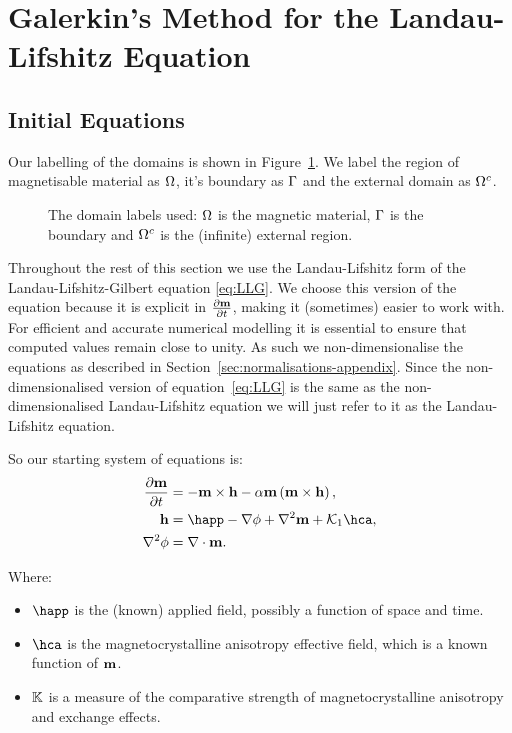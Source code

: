 
\section{Galerkin's Method for the Landau-Lifshitz Equation}
\label{sec:galerk-meth-ll}

\subsection{Initial Equations}

Our labelling of the domains is shown in Figure~\ref{fig:domain_labels}. We label the region of magnetisable material as $\Omega$, it's boundary as ${\Gamma}$ and the external domain as ${\Omega^c}$.

\begin{figure}[!ht]
  \center
  \caption{The domain labels used: $\Omega$ is the magnetic material, ${\Gamma}$ is the boundary and ${\Omega^c}$ is the (infinite) external region.} \label{fig:domain_labels}
\end{figure}

Throughout the rest of this section we use the Landau-Lifshitz form of the Landau-Lifshitz-Gilbert equation \eqref{eq:LLG}.
We choose this version of the equation because it is explicit in $\frac{\partial \mathbf{m}}{\partial t}$, making it (sometimes) easier to work with.
For efficient and accurate numerical modelling it is essential to ensure that computed values remain close to unity.
As such we non-dimensionalise the equations as described in Section~\ref{sec:normalisations-appendix}.
Since the non-dimensionalised version of equation~\eqref{eq:LLG} is the same as the non-dimensionalised Landau-Lifshitz equation we will just refer to it as the Landau-Lifshitz equation.

So our starting system of equations is:
\begin{align}
  \dmdt &= -\mxh -\dampc \mxmxh, \label{eq:ndll} \\
  \hv &= \happ - \nabla \phi + \lap \mv + \kone \hca, \label{eq:ndh} \\
  \lap \phi &= \nabla \cdot \mv. \label{eq:ndphi}
\end{align}

Where:
\begin{itemize}
\item $\happ$ is the (known) applied field, possibly a function of space and time.
\item $\hca$ is the magnetocrystalline anisotropy effective field, which is a known function of $\mathbf{m}$.
\item $\mathbb{K}$ is a measure of the comparative strength of magnetocrystalline anisotropy and exchange effects.
\end{itemize}

